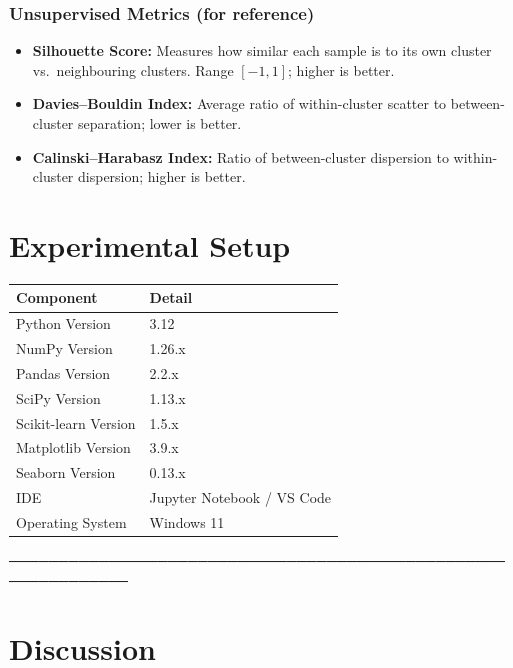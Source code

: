 \documentclass[12pt,a4paper]{article}
\begin{document}
\subsubsection*{Unsupervised Metrics (for reference)}
\begin{itemize}[noitemsep]
  \item \textbf{Silhouette Score:} Measures how similar each sample is to its own cluster
        vs.\ neighbouring clusters. Range $[-1, 1]$; higher is better.
  \item \textbf{Davies--Bouldin Index:} Average ratio of within-cluster scatter to
        between-cluster separation; lower is better.
  \item \textbf{Calinski--Harabasz Index:} Ratio of between-cluster dispersion to
        within-cluster dispersion; higher is better.
\end{itemize}

\section{Experimental Setup}

\begin{tabular}{ll}
\toprule
\textbf{Component}     & \textbf{Detail} \\
\midrule
Python Version         & 3.12 \\
NumPy Version          & 1.26.x \\
Pandas Version         & 2.2.x \\
SciPy Version          & 1.13.x \\
Scikit-learn Version   & 1.5.x \\
Matplotlib Version     & 3.9.x \\
Seaborn Version        & 0.13.x \\
IDE                    & Jupyter Notebook / VS Code \\
Operating System       & Windows 11 \\
\bottomrule
\end{tabular}

──────────────────────────────────────────────────────────────
\section{Discussion}
\end{document}
